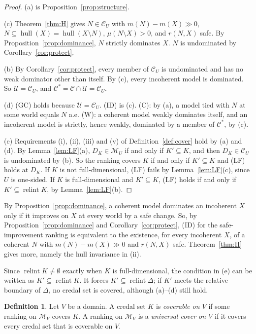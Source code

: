 \documentclass[11pt]{article}
\newcommand{\M}{\mathcal{M}}
\newcommand{\CC}{\mathcal{C}}
\newcommand{\UU}{\mathcal{U}}
\newcommand{\hull}{\operatorname{hull}}
\DeclareMathOperator{\relint}{relint}
\theoremstyle{plain}
\theoremstyle{definition}
\newtheorem{definition}[theorem]{Definition}
\theoremstyle{remark}
\begin{document}
\begin{proof}
(a) is Proposition~\ref{prop:structure}.

(c) Theorem~\ref{thm:H} gives $N\in\CC_U$ with $m(N)-m(X)\gg0$, $N\subseteq\hull(X)=
\hull(X\setminus N)$, $\mu(N\setminus X)>0$, and $r(N,X)$ safe. By
Proposition~\ref{prop:dominance}, $N$ strictly dominates $X$. $N$ is undominated by
Corollary~\ref{cor:protect}.

(b) By Corollary~\ref{cor:protect}, every member of $\CC_U$ is undominated and has no
weak dominator other than itself. By (c), every incoherent model is dominated. So
$\UU=\CC_U$, and $\CC^\ast=\CC\cap\UU=\CC_U$.

(d) (GC) holds because $\UU=\CC_U$. (ID) is (c). (C): by (a), a model tied with $N$ at
some world equals $N$ a.e. (W): a coherent model weakly dominates itself, and an
incoherent model is strictly, hence weakly, dominated by a member of $\CC^\ast$, by (c).

(e) Requirements (i), (ii), (iii) and (v) of Definition~\ref{def:cover} hold by (a) and
(d). By Lemma~\ref{lem:LF}(a), $D_K\in\M_U$ if and only if $K'\subseteq K$, and then
$D_K\in\CC_U$ is undominated by (b). So the ranking covers $K$ if and only if
$K'\subseteq K$ and (LF) holds at $D_K$. If $K$ is not full-dimensional, (LF) fails by
Lemma~\ref{lem:LF}(c), since $U$ is one-sided. If $K$ is full-dimensional and
$K'\subseteq K$, (LF) holds if and only if $K'\subseteq\relint K$, by
Lemma~\ref{lem:LF}(b).
\end{proof}

By Proposition~\ref{prop:dominance}, a coherent model dominates an incoherent $X$ only if
it improves on $X$ at every world by a safe change. So, by Proposition~\ref{prop:dominance}
and Corollary~\ref{cor:protect}, (ID) for the safe-improvement ranking is equivalent to the
existence, for every incoherent $X$, of a coherent $N$ with $m(N)-m(X)\gg0$ and $r(N,X)$
safe. Theorem~\ref{thm:H} gives more, namely the hull invariance in (ii).

Since $\relint K\ne\emptyset$ exactly when $K$ is full-dimensional, the condition in (e)
can be written as $K'\subseteq\relint K$. It forces $K'\subseteq\relint\Delta$; if $K'$
meets the relative boundary of $\Delta$, no credal set is covered, although (a)--(d)
still hold.

\begin{definition}\label{def:universal}
Let $V$ be a domain. A credal set $K$ is \emph{coverable on $V$} if some ranking on $\M_V$
covers $K$. A ranking on $\M_V$ is a \emph{universal cover on $V$} if it covers every
credal set that is coverable on $V$.
\end{definition}
\end{document}
